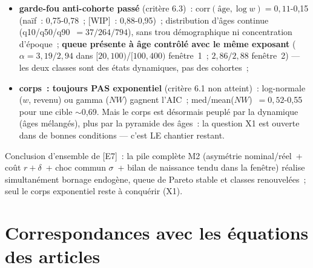 \documentclass[11pt,a4paper]{article}
\newcommand{\NW}{\mathit{NW}}
\begin{document}
\begin{itemize}
\begin{itemize}
    \item \textbf{garde-fou anti-cohorte passé} (critère 6.3)~: $\mathrm{corr}(\text{âge},\log w)=0{,}11$-0,15 (naïf~: 0,75-0,78~; [WIP]~: 0,88-0,95)~; distribution d'âges continue (q10/q50/q90~$=37/264/794$), sans trou démographique ni concentration d'époque~; \textbf{queue présente à âge contrôlé avec le même exposant} ($\alpha=3{,}19/2{,}94$ dans $[20,100)$/$[100,400)$ fenêtre~1~; $2{,}86/2{,}88$ fenêtre~2) --- les deux classes sont des états dynamiques, pas des cohortes~;
    \item \textbf{corps~: toujours PAS exponentiel} (critère 6.1 non atteint)~: log-normale ($w$, revenu) ou gamma ($\NW$) gagnent l'AIC~; med/mean($\NW$)~$=0{,}52$-0,55 pour une cible $\sim$0,69. Mais le corps est désormais peuplé par la dynamique (âges mélangés), plus par la pyramide des âges~: la question X1 est ouverte dans de bonnes conditions --- c'est LE chantier restant.
  \end{itemize}
\end{itemize}

Conclusion d'ensemble de [E7]~: la pile complète M2 (asymétrie nominal/réel~+ coût $r+\delta$~+ choc commun $\sigma$~+ bilan de naissance tendu dans la fenêtre) réalise simultanément bornage endogène, queue de Pareto stable et classes renouvelées~; seul le corps exponentiel reste à conquérir (X1).

\section{Correspondances avec les équations des articles}
\label{sec:annexe-b}
\end{document}

